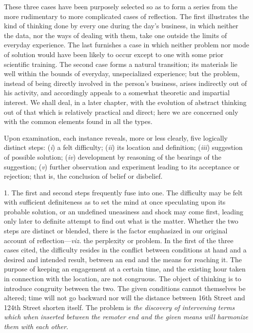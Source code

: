 \documentclass[letterpaper]{book}
\begin{document}
These three cases have been purposely selected so as to form a series
from the more rudimentary to more complicated cases of reflection. The
first illustrates the kind of thinking done by every one during the
day's business, in which neither the data, nor the ways of dealing with
them, take one outside the limits of everyday experience. The last
furnishes a case in which neither problem nor mode of solution would
have been likely to occur except to one with some prior scientific
training. The second case forms a natural transition; its materials lie
well within the bounds of everyday, unspecialized experience; but the
problem, instead of being directly involved in the person's business,
arises indirectly out of his activity, and accordingly appeals to a
somewhat theoretic and impartial interest.
We
shall deal, in a later chapter, with the evolution of abstract thinking
out of that which is relatively practical and direct; here we are
concerned only with the common elements found in all the types.


Upon examination, each instance reveals, more or less clearly, five
logically distinct steps: (\emph{i}) a felt difficulty; (\emph{ii}) its
location and definition; (\emph{iii}) suggestion of possible solution;
(\emph{iv}) development by reasoning of the bearings of the suggestion;
(\emph{v}) further observation and experiment leading to its acceptance
or rejection; that is, the conclusion of belief or disbelief.



1. The first and second steps frequently fuse into one. The difficulty
may be felt with sufficient definiteness as to set the mind at once
speculating upon its probable solution, or an undefined uneasiness and
shock may come first, leading only later to definite attempt to find out
what is the matter. Whether the two steps are distinct or blended, there
is the factor emphasized in our original account of
reflection---\emph{viz.} the perplexity or problem. In the first of the
three cases cited, the difficulty resides in the conflict between
conditions at hand and a desired and intended result, between an end and
the means for reaching it. The purpose of keeping an engagement at a
certain time, and the existing hour taken in connection with the
location, are not congruous. The object of thinking is to introduce
congruity between the two. The given conditions cannot themselves be
altered; time will not go backward nor will the distance between 16th
Street and 124th Street shorten itself. The problem is \emph{the
discovery of intervening terms which when inserted between the remoter
end and the given means will harmonize them with each
other}.
\end{document}
